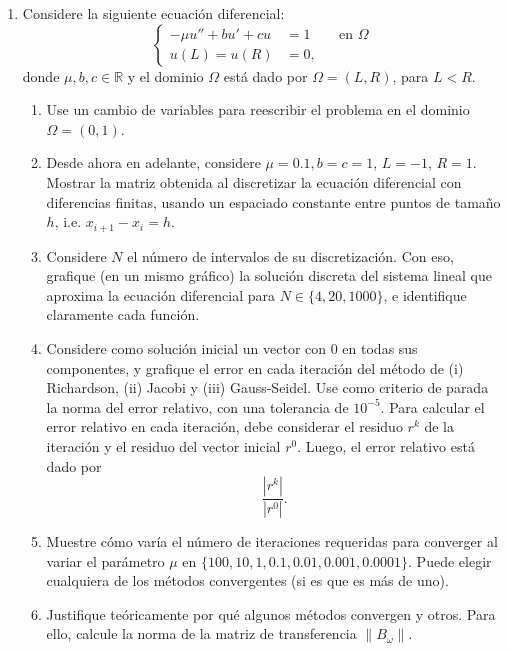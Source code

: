 \documentclass{article}
\newcommand{\pts}[1]{[{\bf #1 puntos}] }
\begin{document}
\begin{enumerate}
    \item Considere la siguiente ecuación diferencial: 
        $$
            \left\lbrace\begin{aligned}
                - \mu u'' + b u' + c u &= 1 && \text{en $\Omega$}\\
                u(L) = u(R) &= 0,
            \end{aligned}\right.
        $$
        donde $\mu, b,c\in \mathbb R$ y el dominio $\Omega$ está dado por $\Omega = (L, R)$, para $ L < R$. 
        \begin{enumerate}
            \item\pts{1} Use un cambio de variables para reescribir el problema en el dominio $\Omega = (0,1)$.
            \item\pts{1} Desde ahora en adelante, considere $\mu=0.1, b=c=1$, $L=-1$, $R=1$. Mostrar la matriz obtenida al discretizar la ecuación diferencial con diferencias finitas, usando un espaciado constante entre puntos de tamaño $h$, i.e. $x_{i+1} - x_i = h$.
            \item\pts{1} Considere $N$ el número de intervalos de su discretización. Con eso, grafique (en un mismo gráfico) la solución discreta del sistema lineal que aproxima la ecuación diferencial para $N\in\{4, 20, 1000\}$, e identifique claramente cada función. 
            \item\pts{1}  Considere como solución inicial un vector con 0 en todas sus componentes, y grafique el error en cada iteración del método de (i) Richardson, (ii) Jacobi y (iii) Gauss-Seidel. Use como criterio de parada la norma del error relativo, con una tolerancia de $10^{-5}$. Para calcular el error relativo en cada iteración, debe considerar el residuo $r^k$ de la iteración y el residuo del vector inicial $r^0$. Luego, el error relativo está dado por 
                    $$ \frac{|r^k|}{|r^0|}. $$
            \item\pts{1} Muestre cómo varía el número de iteraciones requeridas para converger al variar el parámetro $\mu$ en $\{100,10,1,0.1,0.01,0.001,0.0001\}$. Puede elegir cualquiera de los métodos convergentes (si es que es más de uno).
            \item\pts{1} Justifique teóricamente por qué algunos métodos convergen y otros. Para ello, calcule la norma de la matriz de transferencia $\|B_\omega\|$.
    \end{enumerate}
\end{enumerate}
\end{document}
